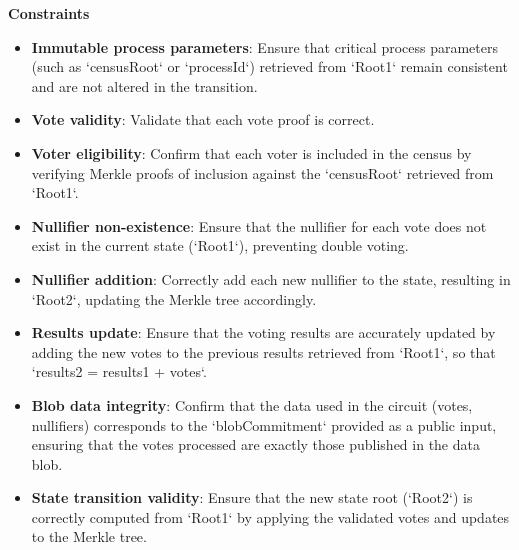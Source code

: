 \begin{mdframed}
\begin{minipage}[H]{1\textwidth}
\begin{spacing}{1.25}
\begin{itemize}
			\end{itemize}
			\textbf{Constraints} \\ \vspace{-0.4cm}		
			\begin{itemize}
				\item \textbf{Immutable process parameters}: Ensure that critical process parameters (such as `censusRoot` or `processId`) retrieved from `Root1` remain consistent and are not altered in the transition.
				\item \textbf{Vote validity}: Validate that each vote proof is correct.
				\item \textbf{Voter eligibility}: Confirm that each voter is included in the census by verifying Merkle proofs of inclusion against the `censusRoot` retrieved from `Root1`.
				\item \textbf{Nullifier non-existence}: Ensure that the nullifier for each vote does not exist in the current state (`Root1`), preventing double voting.
				\item \textbf{Nullifier addition}: Correctly add each new nullifier to the state, resulting in `Root2`, updating the Merkle tree accordingly.
				\item \textbf{Results update}: Ensure that the voting results are accurately updated by adding the new votes to the previous results retrieved from `Root1`, so that `results2 = results1 + votes`.
				\item \textbf{Blob data integrity}: Confirm that the data used in the circuit (votes, nullifiers) corresponds to the `blobCommitment` provided as a public input, ensuring that the votes processed are exactly those published in the data blob.
				\item \textbf{State transition validity}: Ensure that the new state root (`Root2`) is correctly computed from `Root1` by applying the validated votes and updates to the Merkle tree.
			\end{itemize}
			\vspace{-0.3cm}
		\end{spacing}
	\end{minipage}
\end{mdframed}


